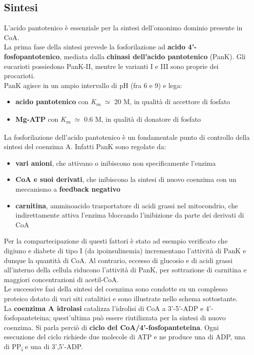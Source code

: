 \documentclass[a4paper, 12pt]{article}
\begin{document}
\subsection{Sintesi}
L'acido pantotenico è essenziale per la sintesi dell'omonimo dominio presente in CoA.\\
La prima fase della sintesi prevede la fosforilazione ad \textbf{acido 4'-fosfopantotenico}, mediata dalla \textbf{chinasi dell'acido pantotenico} (PanK). Gli eucarioti possiedono PanK-II, mentre le varianti I e III sono proprie dei procarioti.\\
PanK agisce in un ampio intervallo di pH (fra 6 e 9) e lega: \begin{itemize}
\item \textbf{acido pantotenico} con \textit{K\textsubscript{m}} $\simeq$ 20 {\textmu}M, in qualità di accettore di fosfato
\item  \textbf{Mg-ATP} con \textit{K\textsubscript{m}} $\simeq$ 0.6 {\textmu}M, in qualità di donatore di fosfato
\end{itemize}
La fosforilazione dell'acido pantotenico è un fondamentale punto di controllo della sintesi del coenzima A. Infatti PanK sono regolate da:
\begin{itemize}
\item \textbf{vari anioni}, che attivano o inibiscono non specificamente l'enzima
\item \textbf{CoA e suoi derivati}, che inibiscono la sintesi di nuovo coenzima con un meccanismo a \textbf{feedback negativo}
\item \textbf{carnitina}, amminoacido trasportatore di acidi grassi nel mitocondrio, che indirettamente attiva l'enzima bloccando l'inibizione da parte dei derivati di CoA
\end{itemize}
Per la compartecipazione di questi fattori è stato ad esempio verificato che digiuno e diabete di tipo I (da ipoinsulinemia) incrementano l'attività di PanK e dunque la quantità di CoA. Al contrario, eccesso di glucosio e di acidi grassi all'interno della cellula riducono l'attività di PanK, per sottrazione di carnitina e maggiori concentrazioni di acetil-CoA.\\
Le successive fasi della sintesi del coenzima sono condotte su un complesso proteico dotato di vari siti catalitici e sono illustrate nello schema sottostante.\\
La \textbf{coenzima A idrolasi} catalizza l'idrolisi di CoA a 3'-5'-ADP e 4'-fosfopanteteina; quest'ultima può essere riutilizzata per la sintesi di nuovo coenzima. Si parla perciò di \textbf{ciclo del CoA/4'-fosfopanteteina}. Ogni esecuzione del ciclo richiede due molecole di ATP e ne produce una di ADP, una di PP\textsubscript{i} e una di 3',5'-ADP.
\end{document}
